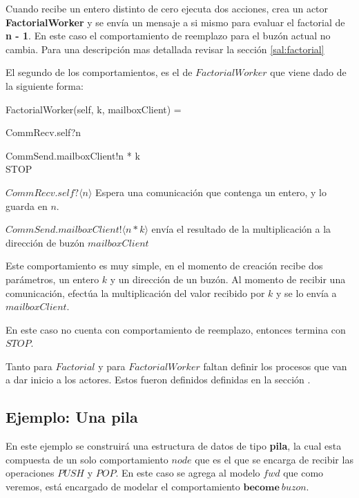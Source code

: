 Cuando recibe un entero distinto de cero ejecuta dos acciones, crea un actor \textbf{FactorialWorker} y se envía un mensaje a si mismo para evaluar el factorial de \textbf{n - 1}. En este caso el comportamiento de reemplazo para el buzón actual no cambia. Para una descripción mas detallada revisar la sección \ref{sal:factorial}

El segundo de los comportamientos, es el de $FactorialWorker$ que viene dado de la siguiente forma:

\begin{process}
FactorialWorker(self, k, mailboxClient) = {} \\ \quad
  \begin{block}
  CommRecv.self?\langle n \rangle \then {} \\ \quad
    \begin{block}
    CommSend.mailboxClient!\langle n * k \rangle \then \\
    STOP
    \end{block}
  \end{block}
\end{process}

\begin{description}
 \item $CommRecv.self?\langle n \rangle$ Espera una comunicación que contenga un entero, y lo guarda en $n$.
 \item $CommSend.mailboxClient!\langle n * k \rangle$ envía el resultado de la multiplicación a la dirección de buzón $mailboxClient$
\end{description}

Este comportamiento es muy simple, en el momento de creación recibe dos parámetros, un entero $k$ y un dirección de un buzón. Al momento de recibir una comunicación, efectúa la multiplicación del valor recibido por $k$ y se lo envía a $mailboxClient$.

En este caso no cuenta con comportamiento de reemplazo, entonces termina con $STOP$.

Tanto para $Factorial$ y para $FactorialWorker$ faltan definir los procesos que van a dar inicio a los actores. Estos fueron definidos definidas en la sección \cite{modelo:crear}. 

\subsection{Ejemplo: Una pila}
En este ejemplo se construirá una estructura de datos de tipo \textbf{pila}, la cual esta compuesta de un solo comportamiento $node$ que es el que se encarga de recibir las operaciones $PUSH$ y $POP$. En este caso se agrega al modelo $fwd$ que como veremos, está encargado de modelar el comportamiento $\textbf{become}\ buzon$.

